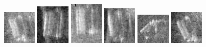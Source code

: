 \begin{figure}
    \centering
    \includegraphics[width=0.15\textwidth]{chapters/images/dataset/all-class-images/can/can-283.jpg}
    \includegraphics[width=0.15\textwidth]{chapters/images/dataset/all-class-images/can/can-180.jpg}
    \includegraphics[width=0.15\textwidth]{chapters/images/dataset/all-class-images/can/can-341.jpg}
    \includegraphics[width=0.15\textwidth]{chapters/images/dataset/all-class-images/can/can-295.jpg}
    \includegraphics[width=0.15\textwidth]{chapters/images/dataset/all-class-images/can/can-17.jpg}
    \includegraphics[width=0.15\textwidth]{chapters/images/dataset/all-class-images/can/can-209.jpg}
    

\end{figure}
